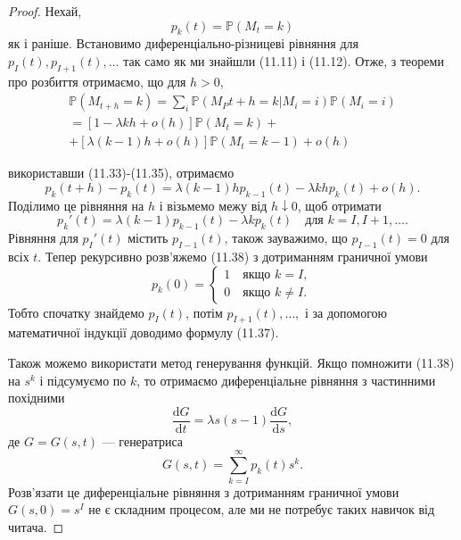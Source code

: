 \documentclass[12pt,fleqn]{article}
\numberwithin{figure}{section}
\numberwithin{equation}{section}
\begin{document}
\begin{proof}
  Нехай,
  $$p_k(t)=\mathbb{P}(M_t=k)$$
  як і раніше. Встановимо диференціально-різницеві рівняння для \\$p_I(t), p_{I+1}(t), \dots$ так само як ми знайшли (11.11) і (11.12). Отже, з теореми про розбиття отримаємо, що для $h>0$,
  \begin{gather*}
    \mathbb{P}(M_{t+h}=k)=\sum_{i}\mathbb{P}(M_P{t+h}=k\big|M_i=i)\mathbb{P}(M_i=i)
     \\ =\left[1-\lambda kh +o(h)\right]\mathbb{P}(M_t=k)+
     \\+\left[\lambda(k-1)h+o(h)\right]\mathbb{P}(M_t=k-1)+o(h)
  \end{gather*}
  
  використавши (11.33)-(11.35), отримаємо
  \[p_k(t+h)-p_k(t)=\lambda(k-1)hp_{k-1}(t)-\lambda khp_k(t) + o(h). \]
  Поділимо це рівняння на $h$ і візьмемо межу від $h\downarrow0$, щоб отримати
  \[p_{k}'(t)=\lambda(k-1)p_{k-1}(t)-\lambda kp_k(t) \quad \text{для } k=I, I+1, \dots.\]
  Рівняння для $p_{I}'(t)$ містить $p_{I-1}(t)$, також зауважимо, що $p_{I-1}(t)=0$ для всіх $t$. Тепер рекурсивно розв'яжемо (11.38) з дотриманням граничної умови
  \begin{equation}\label{11.39}
  p_{k}(0)=\begin{cases}
             1 \quad \text{якщо } k=I, \\
             0 \quad \text{якщо } k\neq I.
           \end{cases}
  \end{equation}
  Тобто спочатку знайдемо $p_{I}(t)$, потім $p_{I+1}(t), \dots,$ і за допомогою математичної індукції доводимо формулу (11.37).

  Також можемо використати метод генерування функцій. Якщо помножити (11.38) на $s^k$ і підсумуємо по $k$, то отримаємо диференціальне рівняння з частинними похідними
  \begin{equation}\label{11.40}
    \frac{\mathrm{d}G}{\mathrm{d}t}=\lambda s(s-1)\frac{\mathrm{d}G}{\mathrm{d}s},
  \end{equation}
  де $G=G(s, t)$ --- генератриса
  $$G(s,t)=\sum_{k=I}^{\infty}p_k(t)s^k.$$
  Розв'язати це диференціальне рівняння з дотриманням граничної умови $G(s,0)=s^I$ не є складним процесом, але ми не потребує таких навичок від читача.
\end{proof}
\end{document}
